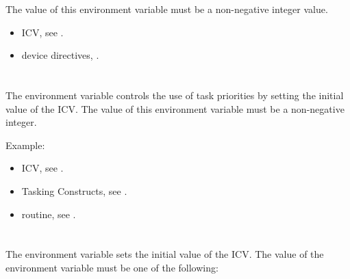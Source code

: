 The value of this environment variable must be a non-negative integer value.

\crossreferences
\begin{itemize}
\item {} ICV, see .

\item device directives, .
\end{itemize}


\section{}
\label{sec:OMP_MAX_TASK_PRIORITY}

The  environment variable controls the use of task
priorities by setting the initial value of the  ICV. The
value of this environment variable must be a non-negative integer.

Example:
\begin{ompEnv}
\end{ompEnv}

\crossreferences
\begin{itemize}
\item {} ICV, see .
\item Tasking Constructs, see .
\item {} routine, see .
\end{itemize}




\section{}
\label{sec:OMP_TARGET_OFFLOAD}
%
The  environment variable sets the initial value of the  ICV.
The value of the  environment variable must be one of
the following:

